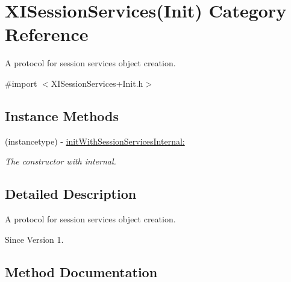 \hypertarget{category_x_i_session_services_07_init_08}{}\section{X\+I\+Session\+Services(Init) Category Reference}
\label{category_x_i_session_services_07_init_08}


A protocol for session services object creation.  




{\ttfamily \#import $<$X\+I\+Session\+Services+\+Init.\+h$>$}

\subsection*{Instance Methods}
\begin{DoxyCompactItemize}
\item 
(instancetype) -\/ \hyperlink{category_x_i_session_services_07_init_08_a0d28149c31bd80883b3a59a653b8680b}{init\+With\+Session\+Services\+Internal\+:}
\begin{DoxyCompactList}\small\item\em The constructor with internal. \end{DoxyCompactList}\end{DoxyCompactItemize}


\subsection{Detailed Description}
A protocol for session services object creation. 

\begin{DoxySince}{Since}
Version 1. 
\end{DoxySince}


\subsection{Method Documentation}
\hypertarget{category_x_i_session_services_07_init_08_a0d28149c31bd80883b3a59a653b8680b}{}\label{category_x_i_session_services_07_init_08_a0d28149c31bd80883b3a59a653b8680b} 
